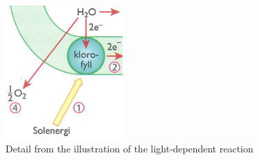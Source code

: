 \begin{figure}
\centering
\includegraphics[width=0.4\textwidth]{img/data_analysis/light_dependent_detail.png}
\caption{Detail from the illustration of the light-dependent reaction \citep{bios}}
\label{fig:lightdependentdetail}
\end{figure}

